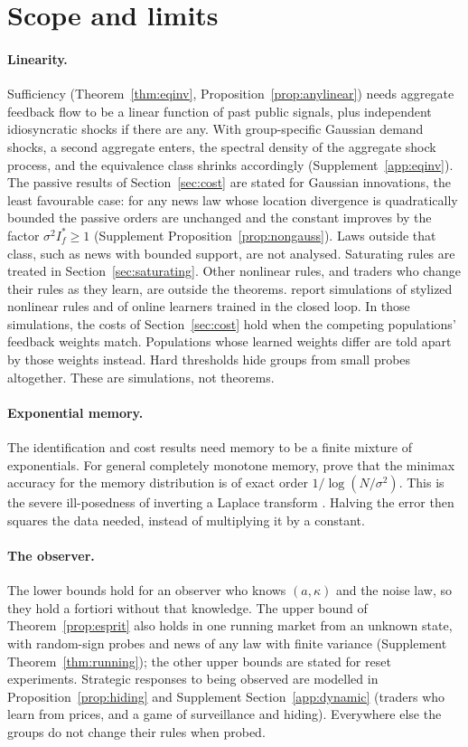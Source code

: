\documentclass[12pt]{article}
\theoremstyle{definition}
\theoremstyle{remark}
\begin{document}
\section{Scope and limits}\label{sec:scope}

\paragraph{Linearity.} Sufficiency (Theorem~\ref{thm:eqinv}, Proposition~\ref{prop:anylinear}) needs aggregate feedback flow to be a linear function of past public signals, plus independent idiosyncratic shocks if there are any. With group-specific Gaussian demand shocks, a second aggregate enters, the spectral density of the aggregate shock process, and the equivalence class shrinks accordingly (Supplement~\ref{app:eqinv}). The passive results of Section~\ref{sec:cost} are stated for Gaussian innovations, the least favourable case: for any news law whose location divergence is quadratically bounded the passive orders are unchanged and the constant improves by the factor $\sigma^2I^*_f\ge1$ (Supplement Proposition~\ref{prop:nongauss}). Laws outside that class, such as news with bounded support, are not analysed. Saturating rules are treated in Section~\ref{sec:saturating}. Other nonlinear rules, and traders who change their rules as they learn, are outside the theorems. \citet{niroula2026a} report simulations of stylized nonlinear rules and of online learners trained in the closed loop. In those simulations, the costs of Section~\ref{sec:cost} hold when the competing populations' feedback weights match. Populations whose learned weights differ are told apart by those weights instead. Hard thresholds hide groups from small probes altogether. These are simulations, not theorems.

\paragraph{Exponential memory.} The identification and cost results need memory to be a finite mixture of exponentials. For general completely monotone memory, \citet{niroula2026a} prove that the minimax accuracy for the memory distribution is of exact order $1/\log(N/\sigma^2)$. This is the severe ill-posedness of inverting a Laplace transform \citep{epstein2008}. Halving the error then squares the data needed, instead of multiplying it by a constant.

\paragraph{The observer.} The lower bounds hold for an observer who knows $(a,\kappa)$ and the noise law, so they hold a fortiori without that knowledge. The upper bound of Theorem~\ref{prop:esprit} also holds in one running market from an unknown state, with random-sign probes and news of any law with finite variance (Supplement Theorem~\ref{thm:running}); the other upper bounds are stated for reset experiments. Strategic responses to being observed are modelled in Proposition~\ref{prop:hiding} and Supplement Section~\ref{app:dynamic} (traders who learn from prices, and a game of surveillance and hiding). Everywhere else the groups do not change their rules when probed.
\end{document}
